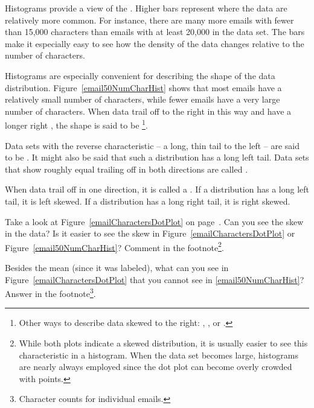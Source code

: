 Histograms provide a view of the . Higher bars represent where the data are relatively more common. For instance, there are many more emails with fewer than 15,000 characters than emails with at least 20,000 in the data set. The bars make it especially easy to see how the density of the data changes relative to the number of characters. %

Histograms are especially convenient for describing the shape of the data distribution\label{shapeFirstDiscussed}. Figure~\ref{email50NumCharHist} shows that most emails have a relatively small number of characters, while fewer emails have a very large number of characters. When data trail off to the right in this way and have a longer right , the shape is said to be \footnote{Other ways to describe data skewed to the right: , , or .}.

Data sets with the reverse characteristic -- a long, thin tail to the left -- are said to be . It might also be said that such a distribution has a long left tail. Data sets that show roughly equal trailing off in both directions are called .

\begin{termBox}{
When data trail off in one direction, it is called a . If a distribution has a long left tail, it is left skewed. If a distribution has a long right tail, it is right skewed.}
\end{termBox}

\begin{exercise}
Take a look at Figure~\ref{emailCharactersDotPlot} on page~\pageref{emailCharactersDotPlot}. Can you see the skew in the data? Is it easier to see the skew in Figure~\ref{emailCharactersDotPlot} or Figure~\ref{email50NumCharHist}? Comment in the footnote\footnote{While both plots indicate a skewed distribution, it is usually easier to see this characteristic in a histogram. When the data set becomes large, histograms are nearly always employed since the dot plot can become overly crowded with points.}.
\end{exercise}

\begin{exercise}
Besides the mean (since it was labeled), what can you see in Figure~\ref{emailCharactersDotPlot} that you cannot see in \ref{email50NumCharHist}? Answer in the footnote\footnote{Character counts for individual emails.}.
\end{exercise}

